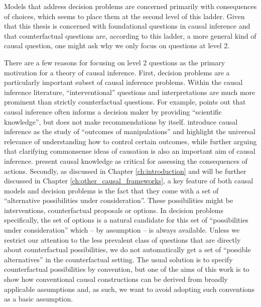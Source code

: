 Models that address decision problems are concerned primarily with consequences of choices, which seems to place them at the second level of this ladder. Given that this thesis is concerned with foundational questions in causal inference and that counterfactual questions are, according to this ladder, a more general kind of causal question, one might ask why we only focus on questions at level 2. 

There are a few reasons for focusing on level 2 questions as the primary motivation for a theory of causal inference. First, decision problems are a particularly important subset of causal inference problems. Within the causal inference literature, ``interventional'' questions and interpretations are much more prominent than strictly counterfactual questions. For example, \citet{rubin_causal_2005} points out that causal inference often informs a decision maker by providing ``scientific knowledge'', but does not make recommendations by itself. \citep{imbens_causal_2015} introduce causal inference as the study of ``outcomes of manipulations'' and \citep{spirtes_causation_1993} highlight the universal relevance of understanding how to control certain outcomes, while further arguing that clarifying commonsense ideas of causation is also an important aim of causal inference. \citet{hernan_whatif_2020} present causal knowledge as critical for assessing the consequences of actions. Secondly, as discussed in Chapter \ref{ch:introduction} and will be further discussed in Chapter \ref{ch:other_causal_frameworks}, a key feature of both causal models and decision problems is the fact that they come with a set of ``alternative possibilities under consideration''. These possibilities might be interventions, counterfactual proposals or options. In decision problems specifically, the set of options is a natural candidate for this set of ``possibilities under consideration'' which -- by assumption -- is always available. Unless we restrict our attention to the less prevalent class of questions that are directly about counterfactual possibilities, we do not automatically get a set of ``possible alternatives'' in the counterfactual setting. The usual solution is to specify counterfactual possibilities by convention, but one of the aims of this work is to show how conventional causal constructions can be derived from broadly applicable assumptions and, as such, we want to avoid adopting such conventions as a basic assumption.

